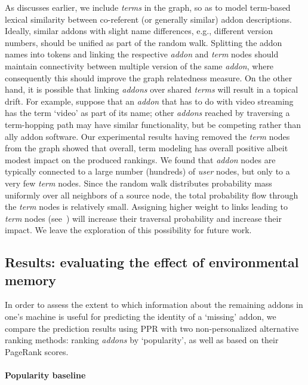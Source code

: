 \documentclass[ijoc,nonblindrev]{informs3} %
\numberwithin{equation}{subsection}
\begin{document}
As discusses earlier, we include {\it terms} in the graph, so as to model term-based lexical similarity between co-referent (or generally similar) addon descriptions. Ideally, similar addons with slight name differences, e.g., different version numbers, should be unified as part of the random walk. Splitting the addon names into tokens and linking the respective {\it addon} and {\it term} nodes should maintain connectivity between multiple version of the same {\it addon}, where consequently this should improve the graph relatedness measure. On the other hand, it is possible that linking {\it addons} over shared {\it terms} will result in a topical drift. For example, suppose that an {\it addon} that has to do with video streaming has the term `video' as part of its name; other {\it addons} reached by traversing a term-hopping path may have similar functionality, but be competing rather than ally addon software. Our experimental results having removed the {\it term} nodes from the graph showed that overall, term modeling has overall positive albeit modest impact on the produced rankings. We found that {\it addon} nodes are typically connected to a large number (hundreds) of {\it user} nodes, but only to a very few {\it term} nodes. Since the random walk distributes probability mass uniformly over all neighbors of a source node, the total probability flow through the {\it term} nodes is relatively small. Assigning higher weight to links leading to {\it term} nodes (see~\cite{minkov2010improving}) will increase their traversal probability and increase their impact. We leave the exploration of this possibility for future work.

\subsection{Results: evaluating the effect of environmental memory}
\label{sec:user_main_results}

In order to assess the extent to which information about the remaining addons in one's machine is useful for predicting the identity of a `missing' addon, we compare the prediction results using PPR with two non-personalized alternative ranking methods: ranking {\it addons} by `popularity', as well as based on their PageRank scores. 

\paragraph{Popularity baseline} 
\end{document}

